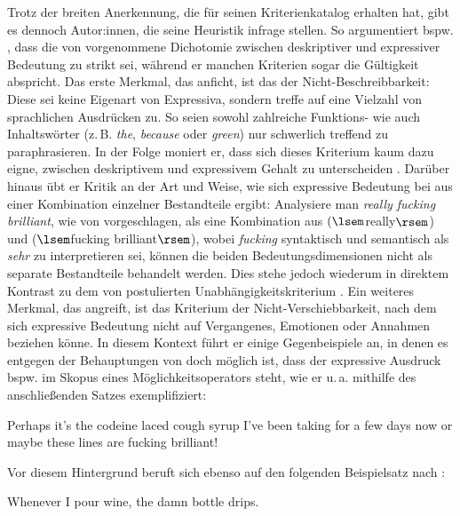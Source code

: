 Trotz der breiten Anerkennung, die \citet[]{Potts.2007a} für seinen Kriterienkatalog erhalten hat, gibt es dennoch Autor:innen, die seine Heuristik infrage stellen. So argumentiert bspw. \citet[209f.]{Geurts.2007}, dass die von {\citet[]{Potts.2007a}} vorgenommene Dichotomie zwischen deskriptiver und expressiver Bedeutung zu strikt sei, während er manchen Kriterien sogar die Gültigkeit abspricht. Das erste Merkmal, das \citet[210]{Geurts.2007} anficht, ist das der Nicht-Beschreibbarkeit: Diese sei keine Eigenart von Expressiva, sondern treffe auf eine Vielzahl von sprachlichen Ausdrücken zu. So seien sowohl zahlreiche Funktions- wie auch Inhaltswörter (z.\,B. \textit{the}, \textit{because} oder \textit{green}) nur schwerlich treffend zu paraphrasieren. In der Folge moniert er, dass sich dieses Kriterium kaum dazu eigne, zwischen deskriptivem und expressivem Gehalt zu unterscheiden \citep[vgl.][210]{Geurts.2007}. Darüber hinaus übt er Kritik an der Art und Weise, wie sich expressive Bedeutung bei \citet[]{Potts.2007a} aus einer Kombination einzelner Bestandteile ergibt: Analysiere man \textit{really fucking brilliant}, wie von \citet[187]{Potts.2007a} vorgeschlagen, als eine Kombination aus $(\lsem$really$\rsem$) und ($\lsem$fucking brilliant$\rsem$), wobei \textit{fucking} syntaktisch und semantisch als \textit{sehr} zu interpretieren sei, können die beiden Bedeutungsdimensionen nicht als separate Bestandteile behandelt werden. Dies stehe jedoch wiederum in direktem Kontrast zu dem von {\citet[167ff.]{Potts.2007a}} postulierten Unabhängigkeitskriterium {\citep[vgl.][211]{Geurts.2007}}. Ein weiteres Merkmal, das {\citet[211f.]{Geurts.2007}} angreift, ist das Kriterium der Nicht-Verschiebbarkeit, nach dem sich expressive Bedeutung nicht auf Vergangenes, Emotionen oder Annahmen beziehen könne. In diesem Kontext führt er einige Gegenbeispiele an, in denen es entgegen der Behauptungen von \citet[]{Potts.2007a} doch möglich ist, dass der expressive Ausdruck bspw. im Skopus eines Möglichkeitsoperators steht, wie er u.\,a. mithilfe des anschließenden Satzes exemplifiziert:
   
\ea  Perhaps it’s the codeine laced cough syrup I’ve been taking for a few days now or maybe these lines are fucking brilliant!
\z

Vor diesem Hintergrund beruft sich \citet[212]{Geurts.2007} ebenso auf den folgenden Beispielsatz nach \citet[171]{Potts.2007a}:

\ea  Whenever I pour wine, the damn bottle drips.  \label{wine}
\z

